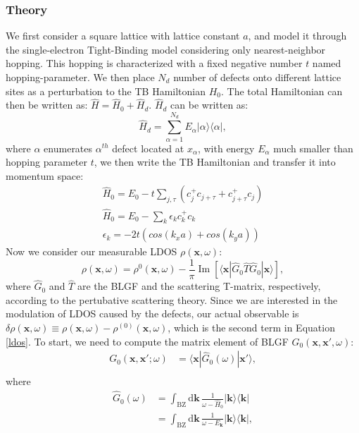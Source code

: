 \subsubsection{Theory}
We first consider a square lattice with lattice constant $a$, and model it through the single-electron Tight-Binding model considering only nearest-neighbor hopping. This hopping is characterized with a fixed negative number $t$ named hopping-parameter. We then place $N_d$ number of defects onto different lattice sites as a perturbation to the \ac{TB} Hamiltonian $H_0$. The total Hamiltonian can then be written as: 
$\hat{H} = \hat{H}_0 + \hat{H}_d$. $\hat{H}_d$ can be written as: 
\[
\hat{H}_d = \sum_{\alpha=1}^{N_d} E_\alpha \lvert \alpha \rangle \langle \alpha \rvert,
\] 
where $\alpha$ enumerates $\alpha^{th}$ defect located at $x_\alpha$, with energy $E_{\alpha}$ much smaller than hopping parameter $t$, we then write the \ac{TB} Hamiltonian and transfer it into momentum space:
\begin{align}
\hat{H}_0 = E_0 -t \sum_{j,\tau} (c_j^{+} c_{j+\tau} + c_{j+\tau}^{+} c_j) \label{h0_real} \\
\hat{H}_0 = E_0 -\sum_{k} \epsilon_k c_k^{+} c_k \label{h0_k} \\
\epsilon_k = -2t(cos(k_x a)+cos(k_y a)) \label{E_k}
\end{align}
Now we consider our measurable \ac{LDOS} $\rho(\mathbf{x},\omega)$:
\begin{equation}
\rho(\mathbf{x},\omega) = \rho^{0}(\mathbf{x},\omega) - \frac{1}{\pi} \operatorname{Im} \left[ \langle \mathbf{x} | \hat{G}_0 \hat{T} \hat{G}_0 |\mathbf{x} \rangle \right],
\label{ldos}
\end{equation}
where $\hat{G}_0$ and $\hat{T}$ are the \ac{BLGF} and the scattering T-matrix, respectively, according to the pertubative scattering theory. Since we are interested in the modulation of \ac{LDOS} caused by the defects, our actual observable is $\delta \rho(\mathbf{x}, \omega) \equiv \rho(\mathbf{x}, \omega) - \rho^{(0)}(\mathbf{x}, \omega)
$, which is the second term in Equation \ref{ldos}.
To start, we need to compute the matrix element of \ac{BLGF} $G_0(\mathbf{x},\mathbf{x'},\omega)$:
\begin{align}
	G_0(\mathbf{x},\mathbf{x}';\omega) &= \langle \mathbf{x} | \hat{G}_0(\omega) | \mathbf{x}' \rangle, \\
\end{align}
where
\begin{align}
	\hat{G}_0(\omega) &= \int_{\text{BZ}} \mathrm{d}\mathbf{k} \, \frac{1}{\omega - \hat{H}_0} \lvert \mathbf{k} \rangle \langle \mathbf{k} \rvert \nonumber \\ 
	&= \int_{\text{BZ}} \mathrm{d}\mathbf{k} \, \frac{1}{\omega - E_\mathbf{k}} \lvert \mathbf{k} \rangle \langle \mathbf{k} \rvert,
\end{align}
